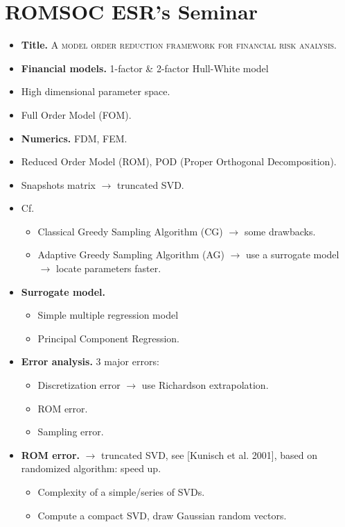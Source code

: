 \documentclass{book}
\numberwithin{equation}{section}
\begin{document}
\section{ROMSOC ESR's Seminar}
\begin{itemize}
    \item \textbf{Title.} \textsc{A model order reduction framework for financial risk analysis.}
    \item \textbf{Financial models.} 1-factor \& 2-factor Hull-White model
    \item High dimensional parameter space.
    \item Full Order Model (FOM).
    \item \textbf{Numerics.} FDM, FEM.
    \item Reduced Order Model (ROM), POD (Proper Orthogonal Decomposition).
    \item Snapshots matrix $\to$ truncated SVD.
    \item Cf.
    \begin{itemize}
        \item Classical Greedy Sampling Algorithm (CG) $\to$ some drawbacks.
        \item Adaptive Greedy Sampling Algorithm (AG) $\to$ use a surrogate model $\to$ locate parameters faster.
    \end{itemize}
    \item \textbf{Surrogate model.}
    \begin{itemize}
        \item Simple multiple regression model
        \item Principal Component Regression.
    \end{itemize}
    \item \textbf{Error analysis.} 3 major errors:
    \begin{itemize}
        \item Discretization error $\to$ use Richardson extrapolation.
        \item ROM error.
        \item Sampling error.
    \end{itemize}
    \item \textbf{ROM error.} $\to$ truncated SVD, see [Kunisch et al. 2001], based on randomized algorithm: speed up.
    \begin{itemize}
        \item Complexity of a simple/series of SVDs.
        \item Compute a compact SVD, draw Gaussian random vectors.

\end{itemize}
\end{itemize}
\end{document}
